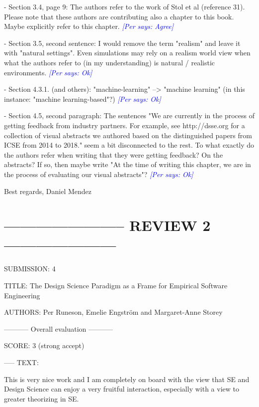 \documentclass{article}
\newcommand{\per}[1]{\textcolor{blue}
        	{{\it [Per says: #1]}}}
\newcommand{\per}[1]{}
\begin{document}
- Section 3.4, page 9: The authors refer to the work of Stol et al (reference 31). Please note that these authors are contributing also a chapter to this book. Maybe explicitly refer to this chapter. \per{Agree}

- Section 3.5, second sentence: I would remove the term "realism" and leave it with "natural settings". Even simulations may rely on a realism world view when what the authors refer to (in my understanding) is natural / realistic environments. \per{Ok}

- Section 4.3.1. (and others): "machine-learning" --> "machine learning" (in this instance: "machine learning-based"?) \per{Ok}

- Section 4.5, second paragraph: The sentences "We are currently in the process of getting feedback from industry partners. For example, see http://dsse.org for a collection of visual abstracts we authored based on the distinguished papers from ICSE from 2014 to 2018." seem a bit disconnected to the rest. To what exactly do the authors refer when writing that they were getting feedback? On the abstracts? If so, then maybe write "At the time of writing this chapter, we are in the process of evaluating our visual abstracts"? \per{Ok}

Best regards, 
Daniel Mendez



\section*{----------------------- REVIEW 2 ---------------------}
SUBMISSION: 4

TITLE: The Design Science Paradigm as a Frame for Empirical Software Engineering

AUTHORS: Per Runeson, Emelie Engström and Margaret-Anne Storey

----------- Overall evaluation -----------

SCORE: 3 (strong accept)

----- TEXT:

This is very nice work and I am completely on board with the view that SE and Design Science can enjoy a very fruitful interaction, especially with a view to greater theorizing in SE.
\end{document}

